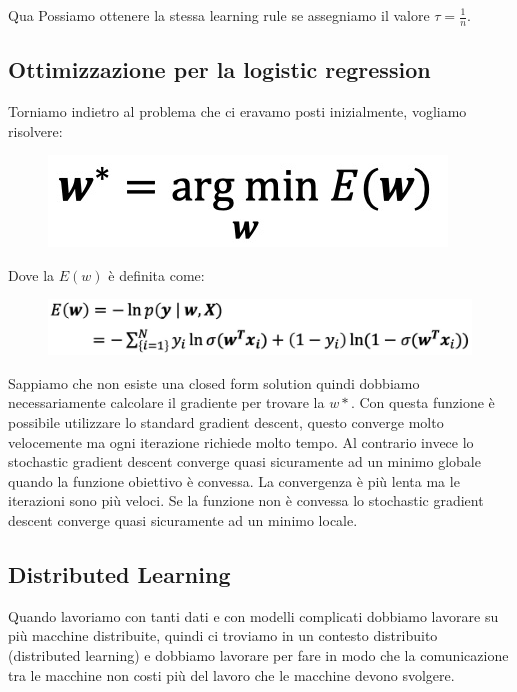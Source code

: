 \documentclass[14pt]{extreport}
\begin{document}
Qua Possiamo ottenere la stessa learning rule se assegniamo il valore $\tau=\frac{1}{n}$.

\subsection{Ottimizzazione per la logistic regression}

Torniamo indietro al problema che ci eravamo posti inizialmente, vogliamo risolvere:

\begin{figure}[H]
	\centering
	\includegraphics[width=0.7\linewidth]{270.jpeg}
\end{figure}

Dove la $E(w)$ è definita come:

\begin{figure}[H]
	\centering
	\includegraphics[width=0.7\linewidth]{271.jpeg}
\end{figure}

Sappiamo che non esiste una closed form solution quindi dobbiamo necessariamente calcolare il gradiente per trovare la $w*$. Con questa funzione è
possibile utilizzare lo standard gradient descent, questo converge molto velocemente ma ogni iterazione richiede molto tempo. Al contrario invece lo
stochastic gradient descent converge quasi sicuramente ad un minimo globale quando la funzione obiettivo è convessa. La convergenza è più lenta ma le
iterazioni sono più veloci. Se la funzione non è convessa lo stochastic gradient descent converge quasi sicuramente ad un minimo locale.

\subsection{Distributed Learning}

Quando lavoriamo con tanti dati e con modelli complicati dobbiamo lavorare su più macchine distribuite, quindi ci troviamo in un contesto distribuito
(distributed learning) e dobbiamo lavorare per fare in modo che la comunicazione tra le macchine non costi più del lavoro che le macchine devono
svolgere.
\end{document}
